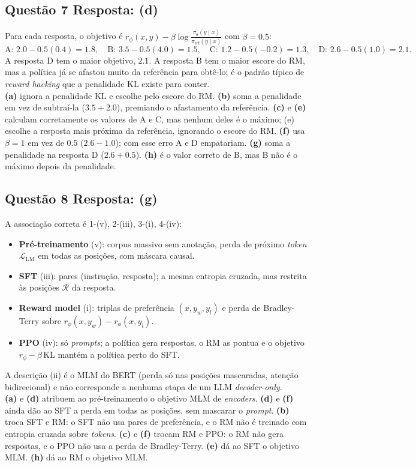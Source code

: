\documentclass[11pt,a4paper]{article}
\begin{document}
\subsection*{Questão 7 \textemdash{} Resposta: (d)}
Para cada resposta, o objetivo é $r_\phi(x, y) - \beta \log\frac{\pi_\theta(y \mid x)}{\pi_\text{ref}(y \mid x)}$ com $\beta = 0.5$:
\[
\text{A: } 2.0 - 0.5(0.4) = 1.8, \quad
\text{B: } 3.5 - 0.5(4.0) = 1.5, \quad
\text{C: } 1.2 - 0.5(-0.2) = 1.3, \quad
\text{D: } 2.6 - 0.5(1.0) = 2.1.
\]
A resposta D tem o maior objetivo, $2.1$. A resposta B tem o maior escore do RM, mas a política já se afastou muito da referência para obtê-lo; é o padrão típico de \textit{reward hacking} que a penalidade KL existe para conter.\\
\textbf{(a)} ignora a penalidade KL e escolhe pelo escore do RM.
\textbf{(b)} soma a penalidade em vez de subtraí-la ($3.5 + 2.0$), premiando o afastamento da referência.
\textbf{(c)} e \textbf{(e)} calculam corretamente os valores de A e C, mas nenhum deles é o máximo; (e) escolhe a resposta mais próxima da referência, ignorando o escore do RM.
\textbf{(f)} usa $\beta = 1$ em vez de $0.5$ ($2.6 - 1.0$); com esse erro A e D empatariam.
\textbf{(g)} soma a penalidade na resposta D ($2.6 + 0.5$).
\textbf{(h)} é o valor correto de B, mas B não é o máximo depois da penalidade.

\subsection*{Questão 8 \textemdash{} Resposta: (g)}
A associação correta é 1-(v), 2-(iii), 3-(i), 4-(iv):
\begin{itemize}
  \item \textbf{Pré-treinamento} (v): corpus massivo sem anotação, perda de próximo \textit{token} $\mathcal{L}_\text{LM}$ em todas as posições, com máscara causal.
  \item \textbf{SFT} (iii): pares (instrução, resposta); a mesma entropia cruzada, mas restrita às posições $\mathcal{R}$ da resposta.
  \item \textbf{Reward model} (i): triplas de preferência $(x, y_w, y_l)$ e perda de Bradley-Terry sobre $r_\phi(x,y_w) - r_\phi(x,y_l)$.
  \item \textbf{PPO} (iv): só \textit{prompts}; a política gera respostas, o RM as pontua e o objetivo $r_\phi - \beta\,\text{KL}$ mantém a política perto do SFT.
\end{itemize}
A descrição (ii) é o MLM do BERT (perda só nas posições mascaradas, atenção bidirecional) e não corresponde a nenhuma etapa de um LLM \textit{decoder-only}.\\
\textbf{(a)} e \textbf{(d)} atribuem ao pré-treinamento o objetivo MLM de \textit{encoders}. \textbf{(d)} e \textbf{(f)} ainda dão ao SFT a perda em todas as posições, sem mascarar o \textit{prompt}.
\textbf{(b)} troca SFT e RM: o SFT não usa pares de preferência, e o RM não é treinado com entropia cruzada sobre \textit{tokens}.
\textbf{(c)} e \textbf{(f)} trocam RM e PPO: o RM não gera respostas, e o PPO não usa a perda de Bradley-Terry.
\textbf{(e)} dá ao SFT o objetivo MLM.
\textbf{(h)} dá ao RM o objetivo MLM.
\end{document}
